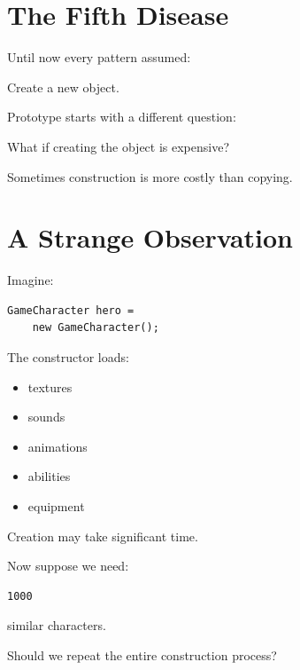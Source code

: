 \documentclass[11pt,a4paper]{book}
\begin{document}
\section{The Fifth Disease}

\begin{idea}

Until now every pattern assumed:

\begin{center}
Create a new object.
\end{center}

Prototype starts with a different question:

\begin{center}
What if creating the object is expensive?
\end{center}

\end{idea}

Sometimes construction is more costly than copying.


\section{A Strange Observation}

Imagine:

\begin{verbatim}
GameCharacter hero =
    new GameCharacter();
\end{verbatim}

The constructor loads:

\begin{itemize}

\item textures
\item sounds
\item animations
\item abilities
\item equipment
\end{itemize}

Creation may take significant time.

Now suppose we need:

\begin{verbatim}
1000
\end{verbatim}

similar characters.

Should we repeat the entire construction process?

\end{document}
